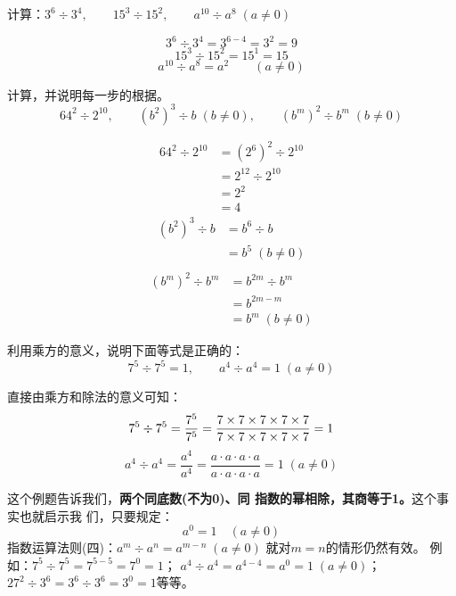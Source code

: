 \begin{example}
	计算：$3^6\div 3^4,\qquad 15^3\div 15^2,\qquad a^{10}\div a^8 \; (a\ne 0)$
\end{example}

\begin{solution}
	\[3^6\div 3^4=3^{6-4}=3^2=9 \]
	\[15^3\div 15^2=15^1=15\]
	\[a^{10}\div a^8=a^2\qquad (a\ne 0)\]
\end{solution}

\begin{example}
	计算，并说明每一步的根据。
	\[64^2\div 2^{10},\qquad (b^2)^3\div b\; (b\ne 0),\qquad (b^m)^2\div b^m\; (b\ne 0) \]
\end{example}

\begin{solution}
	\begin{align*}
	64^2\div 2^{10}&=(2^6)^2\div 2^{10} \tag{乘方的意义}\\
	&=2^{12}\div 2^{10} \tag{指数运算律（三）}\\
	&=2^2 \tag{指数运算律（四）}\\
	&=4\tag{乘方的意义}
	\end{align*}    
	\begin{align*}
	(b^2)^3\div b &=b^6\div b \tag{指数运算律（三）}\\
	&=b^5 \; (b\ne 0)\tag{指数运算律（四）}\\
	\end{align*} 
	\begin{align*}
	(b^m)^2\div b^m  &=b^{2m}\div b^m \tag{指数运算律（三）}\\
	&=b^{2m-m}\tag{指数运算律（四）}\\
	&=b^m \; (b\ne 0)
	\end{align*} 
\end{solution}

\begin{example}
	利用乘方的意义，说明下面等式是正确的：
	\[7^5\div 7^5=1,\qquad a^4\div a^4=1\; (a\ne 0) \]
\end{example}

\begin{solution}
	直接由乘方和除法的意义可知：
	\[ 7^5\div 7^5=\dfrac{7^5}{7^5}=\dfrac{7\times7\times7\times7\times7}{7\times7\times7\times7\times7}=1 \]
	\[a^4\div a^4=\frac{a^4}{a^4}=\frac{a\cdot a\cdot a\cdot a}{a\cdot a\cdot a\cdot a}=1\; (a\ne 0)\]
\end{solution}

这个例题告诉我们，\textbf{两个同底数(不为0)、同
	指数的幂相除，其商等于1。}这个事实也就启示我
们，只要规定：
\[a^0=1\quad (a\ne 0) \]
指数运算法则(四)：$a^m\div a^n=a^{m-n}\; (a\ne 0)$
就对$m=n$的情形仍然有效。
例如：$7^5\div 7^5=7^{5-5}=7^0=1$；
$a^4\div a^4=a^{4-4}=a^0=1\; (a\ne 0)$；$27^2\div 3^6=3^6\div 3^6=3^0=1$等等。

